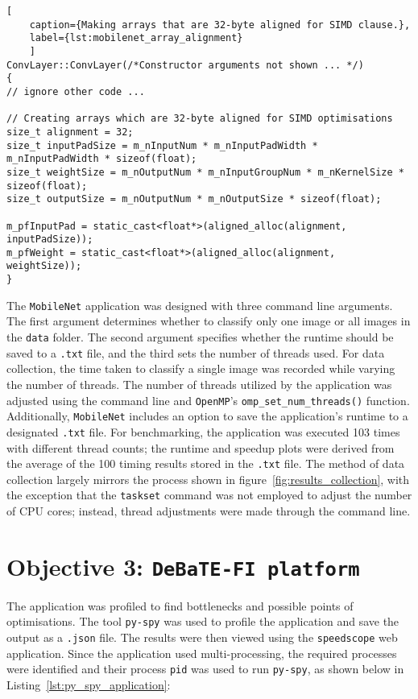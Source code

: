 \begin{lstlisting}[
	caption={Making arrays that are 32-byte aligned for SIMD clause.},
	label={lst:mobilenet_array_alignment}
	]
ConvLayer::ConvLayer(/*Constructor arguments not shown ... */) 
{
// ignore other code ... 

// Creating arrays which are 32-byte aligned for SIMD optimisations 
size_t alignment = 32;
size_t inputPadSize = m_nInputNum * m_nInputPadWidth * m_nInputPadWidth * sizeof(float);
size_t weightSize = m_nOutputNum * m_nInputGroupNum * m_nKernelSize * sizeof(float);
size_t outputSize = m_nOutputNum * m_nOutputSize * sizeof(float);

m_pfInputPad = static_cast<float*>(aligned_alloc(alignment, inputPadSize));
m_pfWeight = static_cast<float*>(aligned_alloc(alignment, weightSize));
}
\end{lstlisting}

The \texttt{MobileNet} application was designed with three command line arguments. The first argument determines whether to classify only one image or all images in the \texttt{data} folder. The second argument specifies whether the runtime should be saved to a \texttt{.txt} file, and the third sets the number of threads used. For data collection, the time taken to classify a single image was recorded while varying the number of threads. The number of threads utilized by the application was adjusted using the command line and \texttt{OpenMP}'s \texttt{omp\_set\_num\_threads()} function. Additionally, \texttt{MobileNet} includes an option to save the application's runtime to a designated \texttt{.txt} file. For benchmarking, the application was executed 103 times with different thread counts; the runtime and speedup plots were derived from the average of the 100 timing results stored in the \texttt{.txt} file. The method of data collection largely mirrors the process shown in figure~\ref{fig:results_collection}, with the exception that the \texttt{taskset} command was not employed to adjust the number of CPU cores; instead, thread adjustments were made through the command line.

\section{Objective 3: \texttt{DeBaTE-FI platform}}

The application was profiled to find bottlenecks and possible points of optimisations. The tool \texttt{py-spy} was used to profile the application and save the output as a \texttt{.json} file. The results were then viewed using the \texttt{speedscope} web application\cite{speedscope_app}. Since the application used multi-processing, the required processes were identified and their process \texttt{pid} was used to run \texttt{py-spy}, as shown below in Listing~\ref{lst:py_spy_application}:

